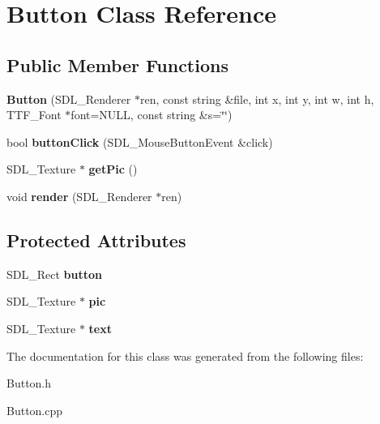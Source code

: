 \hypertarget{class_button}{}\section{Button Class Reference}
\label{class_button}
\subsection*{Public Member Functions}
\begin{DoxyCompactItemize}
\item 
{\bfseries Button} (S\+D\+L\+\_\+\+Renderer $\ast$ren, const string \&file, int x, int y, int w, int h, T\+T\+F\+\_\+\+Font $\ast$font=N\+U\+LL, const string \&s=\char`\"{}\char`\"{})\hypertarget{class_button_a5d841cfdfa9ac8d1db10747ecd94dcdd}{}\label{class_button_a5d841cfdfa9ac8d1db10747ecd94dcdd}

\item 
bool {\bfseries button\+Click} (S\+D\+L\+\_\+\+Mouse\+Button\+Event \&click)\hypertarget{class_button_a374d116950c2390f883088c7afb107d6}{}\label{class_button_a374d116950c2390f883088c7afb107d6}

\item 
S\+D\+L\+\_\+\+Texture $\ast$ {\bfseries get\+Pic} ()\hypertarget{class_button_ab22d97c11b0e63f90ef584fc9a5c0f6d}{}\label{class_button_ab22d97c11b0e63f90ef584fc9a5c0f6d}

\item 
void {\bfseries render} (S\+D\+L\+\_\+\+Renderer $\ast$ren)\hypertarget{class_button_a599b95776f845111b8245ff15c13f2f1}{}\label{class_button_a599b95776f845111b8245ff15c13f2f1}

\end{DoxyCompactItemize}
\subsection*{Protected Attributes}
\begin{DoxyCompactItemize}
\item 
S\+D\+L\+\_\+\+Rect {\bfseries button}\hypertarget{class_button_aa552275b84734a66578ab684e51ab64a}{}\label{class_button_aa552275b84734a66578ab684e51ab64a}

\item 
S\+D\+L\+\_\+\+Texture $\ast$ {\bfseries pic}\hypertarget{class_button_adf19f779ff118533b103aedcf743b8bf}{}\label{class_button_adf19f779ff118533b103aedcf743b8bf}

\item 
S\+D\+L\+\_\+\+Texture $\ast$ {\bfseries text}\hypertarget{class_button_a08d8969454e7a566717d2488a788bd78}{}\label{class_button_a08d8969454e7a566717d2488a788bd78}

\end{DoxyCompactItemize}


The documentation for this class was generated from the following files\+:\begin{DoxyCompactItemize}
\item 
Button.\+h\item 
Button.\+cpp\end{DoxyCompactItemize}
